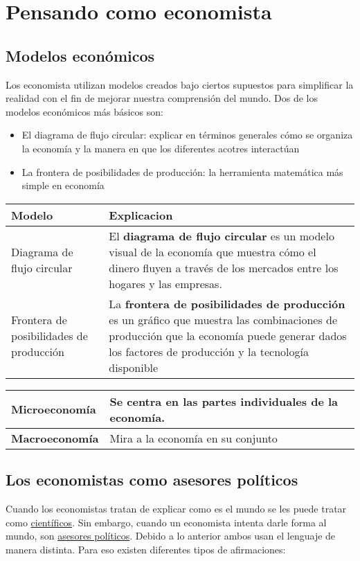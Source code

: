 \section{Pensando como economista}
\subsection{Modelos económicos}
Los economista utilizan modelos creados bajo ciertos supuestos para simplificar la realidad con el fin de mejorar nuestra comprensión del mundo. Dos de los modelos económicos más básicos son:
\begin{itemize}
\item El diagrama de flujo circular: explicar en términos generales cómo se organiza la economía y la manera en que los diferentes acotres interactúan
\item La frontera de posibilidades de producción: la herramienta matemática más simple en economía
\end{itemize}

\begingroup
\setlength{\tabcolsep}{5pt} %
\renewcommand{\arraystretch}{1.5} %
\begin{center}
\begin{tabular}{p{3.5cm}|p{13cm}}
Modelo&Explicacion\\ \hline
Diagrama de flujo circular&El {\bf diagrama de flujo circular} es un modelo visual de la economía que muestra cómo el dinero fluyen a través de los mercados entre los hogares y las empresas.\\
Frontera de posibilidades de producción& La {\bf frontera de posibilidades de producción} es un gráfico que muestra las combinaciones de producción que la economía puede generar dados los factores de producción y la tecnología disponible
\end{tabular}
\end{center}
\endgroup

\begingroup
\setlength{\tabcolsep}{5pt} %
\renewcommand{\arraystretch}{1.5} %
\begin{center}
\begin{tabular}{l|l}
{\bf Microeconomía}&Se centra en las partes individuales de la economía.\\ \hline
{\bf Macroeconomía}&Mira a la economía en su conjunto
\end{tabular}
\end{center}
\endgroup

\subsection{Los economistas como asesores políticos}
Cuando los economistas tratan de explicar como es el mundo se les puede tratar como \underline{científicos}. Sin embargo, cuando un economista intenta darle forma al mundo, son \underline{asesores políticos}. Debido a lo anterior ambos usan el lenguaje de manera distinta. Para eso existen diferentes tipos de afirmaciones:

